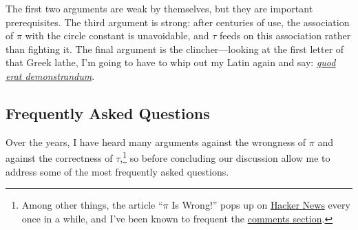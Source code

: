 \documentclass{article}
\begin{document}
The first two arguments are weak by themselves, but they are important prerequisites. The third argument is strong: after centuries of use, the association of $\pi$ with the circle constant is unavoidable, and $\tau$ feeds on this association rather than fighting it. The final argument is the clincher---looking at the first letter of that Greek lathe, I'm going to have to whip out my Latin again and say:  \href{http://en.wikipedia.org/wiki/Q.E.D.}{\emph{quod erat demonstrandum}}.

  \subsection{Frequently Asked Questions} %
  \label{sec:faq}

Over the years, I have heard many arguments against the wrongness of $\pi$ and against the correctness of $\tau$,\footnote{Among other things, the article ``$\pi$ Is Wrong!'' pops up on \href{http://news.ycombinator.com/news}{Hacker News} every once in a while, and I've been known to frequent the  \href{http://news.ycombinator.com/item?id=912082}{comments section}.} so before concluding our discussion allow me to address some of the most frequently asked questions.
\end{document}
